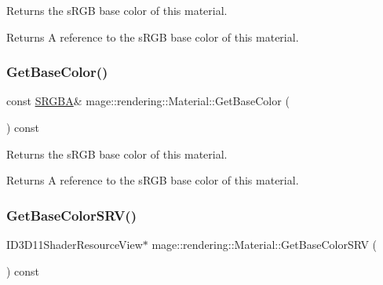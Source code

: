 Returns the s\+R\+GB base color of this material.

\begin{DoxyReturn}{Returns}
A reference to the s\+R\+GB base color of this material. 
\end{DoxyReturn}
\hypertarget{classmage_1_1rendering_1_1_material_a600b48c0711a4b72813a18619b039e07}{}\label{classmage_1_1rendering_1_1_material_a600b48c0711a4b72813a18619b039e07} 
\subsubsection{\texorpdfstring{Get\+Base\+Color()}{GetBaseColor()}\hspace{0.1cm}{\footnotesize\ttfamily [2/2]}}
{\footnotesize\ttfamily const \hyperlink{structmage_1_1_s_r_g_b_a}{S\+R\+G\+BA}\& mage\+::rendering\+::\+Material\+::\+Get\+Base\+Color (\begin{DoxyParamCaption}{ }\end{DoxyParamCaption}) const\hspace{0.3cm}{\ttfamily [noexcept]}}

Returns the s\+R\+GB base color of this material.

\begin{DoxyReturn}{Returns}
A reference to the s\+R\+GB base color of this material. 
\end{DoxyReturn}
\hypertarget{classmage_1_1rendering_1_1_material_a363d85135b18e4e8c8a0b1d2fd88a435}{}\label{classmage_1_1rendering_1_1_material_a363d85135b18e4e8c8a0b1d2fd88a435} 
\subsubsection{\texorpdfstring{Get\+Base\+Color\+S\+R\+V()}{GetBaseColorSRV()}}
{\footnotesize\ttfamily I\+D3\+D11\+Shader\+Resource\+View$\ast$ mage\+::rendering\+::\+Material\+::\+Get\+Base\+Color\+S\+RV (\begin{DoxyParamCaption}{ }\end{DoxyParamCaption}) const\hspace{0.3cm}{\ttfamily [noexcept]}}

